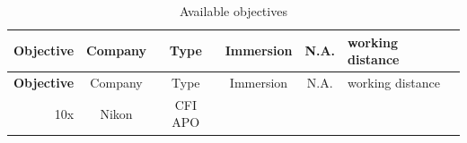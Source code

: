 \documentclass[11pt,singlespacinge,twoside]{reedthesis} %
\begin{document}
\begin{longtable}[]{@{}rccccl@{}}
\caption{\label{tab:objectives} Available objectives}\tabularnewline
\toprule
\begin{minipage}[b]{0.16\columnwidth}\raggedleft
\textbf{Objective}\strut
\end{minipage} & \begin{minipage}[b]{0.11\columnwidth}\centering
Company\strut
\end{minipage} & \begin{minipage}[b]{0.14\columnwidth}\centering
Type\strut
\end{minipage} & \begin{minipage}[b]{0.13\columnwidth}\centering
Immersion\strut
\end{minipage} & \begin{minipage}[b]{0.08\columnwidth}\centering
N.A.\strut
\end{minipage} & \begin{minipage}[b]{0.21\columnwidth}\raggedright
working distance\strut
\end{minipage}\tabularnewline
\midrule
\endfirsthead
\toprule
\begin{minipage}[b]{0.16\columnwidth}\raggedleft
\textbf{Objective}\strut
\end{minipage} & \begin{minipage}[b]{0.11\columnwidth}\centering
Company\strut
\end{minipage} & \begin{minipage}[b]{0.14\columnwidth}\centering
Type\strut
\end{minipage} & \begin{minipage}[b]{0.13\columnwidth}\centering
Immersion\strut
\end{minipage} & \begin{minipage}[b]{0.08\columnwidth}\centering
N.A.\strut
\end{minipage} & \begin{minipage}[b]{0.21\columnwidth}\raggedright
working distance\strut
\end{minipage}\tabularnewline
\midrule
\endhead
\begin{minipage}[t]{0.16\columnwidth}\raggedleft
10x\strut
\end{minipage} & \begin{minipage}[t]{0.11\columnwidth}\centering
Nikon\strut
\end{minipage} & \begin{minipage}[t]{0.14\columnwidth}\centering
CFI APO\strut
\end{minipage} & \begin{minipage}[t]{0.13\columnwidth}\centering

\end{minipage}
\end{longtable}
\end{document}
